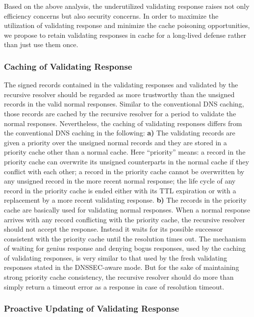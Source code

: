 \documentclass[conference]{IEEEtran}
\begin{document}
Based on the above analysis, the underutilized validating response raises not only efficiency concerns but also security concerns. In order to maximize the utilization of validating response and minimize the cache poisoning opportunities, we propose to retain validating responses in cache for a long-lived defense rather than just use them once.

\subsubsection{Caching of Validating Response}

The signed records contained in the validating responses and validated by the recursive resolver should be regarded as more trustworthy than the unsigned records in the valid normal responses. Similar to the conventional DNS caching, those records are cached by the recursive resolver for a period to validate the normal responses. Nevertheless, the caching of validating responses differs from the conventional DNS caching in the following:
\textbf{a)} The validating records are given a priority over the unsigned normal records and they are stored in a priority cache other than a normal cache. Here ``priority'' means: a record in the priority cache can overwrite its unsigned counterparts in the normal cache if they conflict with each other; a record in the priority cache cannot be overwritten by any unsigned record in the more recent normal response; the life cycle of any record in the priority cache is ended either with its TTL expiration or with a replacement by a more recent validating response.
\textbf{b)} The records in the priority cache are basically used for validating normal responses. When a normal response arrives with any record conflicting with the priority cache, the recursive resolver should not accept the response. Instead it waits for its possible successor consistent with the priority cache until the resolution times out. The mechanism of waiting for genius response and denying bogus responses, used by the caching of validating responses, is very similar to that used by the fresh validating responses stated in the DNSSEC-aware mode. But for the sake of maintaining strong priority cache consistency, the recursive resolver should do more than simply return a timeout error as a response in case of resolution timeout.

\subsubsection{Proactive Updating of Validating Response}
\end{document}
